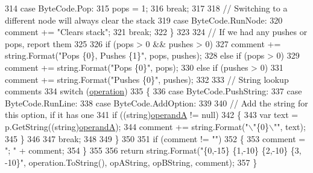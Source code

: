 \begin{DoxyCode}
314                 \textcolor{keywordflow}{case} ByteCode.Pop:
315                     pops = 1;
316                     \textcolor{keywordflow}{break};
317 
318                 \textcolor{comment}{// Switching to a different node will always clear the stack}
319                 \textcolor{keywordflow}{case} ByteCode.RunNode:
320                     comment += \textcolor{stringliteral}{"Clears stack"};
321                     \textcolor{keywordflow}{break};
322             \}
323 
324             \textcolor{comment}{// If we had any pushes or pops, report them}
325 
326             \textcolor{keywordflow}{if} (pops > 0 && pushes > 0)
327                 comment += string.Format(\textcolor{stringliteral}{"Pops \{0\}, Pushes \{1\}"}, pops, pushes);
328             \textcolor{keywordflow}{else} \textcolor{keywordflow}{if} (pops > 0)
329                 comment += string.Format(\textcolor{stringliteral}{"Pops \{0\}"}, pops);
330             \textcolor{keywordflow}{else} \textcolor{keywordflow}{if} (pushes > 0)
331                 comment += string.Format(\textcolor{stringliteral}{"Pushes \{0\}"}, pushes);
332 
333             \textcolor{comment}{// String lookup comments}
334             \textcolor{keywordflow}{switch} (\hyperlink{a00109_a566bf5f7198cc353ea5c3710cb3a31cb}{operation})
335             \{
336                 \textcolor{keywordflow}{case} ByteCode.PushString:
337                 \textcolor{keywordflow}{case} ByteCode.RunLine:
338                 \textcolor{keywordflow}{case} ByteCode.AddOption:
339 
340                     \textcolor{comment}{// Add the string for this option, if it has one}
341                     \textcolor{keywordflow}{if} ((\textcolor{keywordtype}{string})\hyperlink{a00109_ab5d386faa0d3dbc23db80f8e62706afd}{operandA} != null)
342                     \{
343                         var text = p.GetString((string)\hyperlink{a00109_ab5d386faa0d3dbc23db80f8e62706afd}{operandA});
344                         comment += string.Format(\textcolor{stringliteral}{"\(\backslash\)"\{0\}\(\backslash\)""}, text);
345                     \}
346 
347                     \textcolor{keywordflow}{break};
348 
349             \}
350 
351             \textcolor{keywordflow}{if} (comment != \textcolor{stringliteral}{""})
352             \{
353                 comment = \textcolor{stringliteral}{"; "} + comment;
354             \}
355 
356             \textcolor{keywordflow}{return} string.Format(\textcolor{stringliteral}{"\{0,-15\} \{1,-10\} \{2,-10\} \{3, -10\}"}, operation.ToString(), opAString, 
      opBString, comment);
357         \}
\end{DoxyCode}


